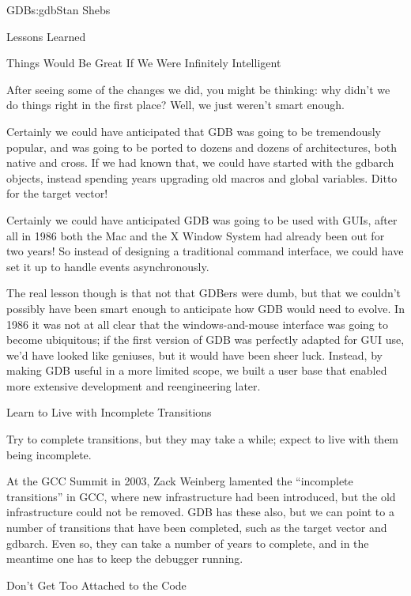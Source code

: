 \begin{aosachapter}{GDB}{s:gdb}{Stan Shebs}
\begin{aosasect1}{Lessons Learned}
\begin{aosasect2}{Things Would Be Great If We Were Infinitely Intelligent}

After seeing some of the changes we did, you might be thinking: why
didn't we do things right in the first place?  Well, we just weren't
smart enough.

Certainly we could have anticipated that GDB was going to be
tremendously popular, and was going to be ported to dozens and dozens
of architectures, both native and cross.  If we had known that, we
could have started with the gdbarch objects, instead spending years
upgrading old macros and global variables.  Ditto for the target
vector!

Certainly we could have anticipated GDB was going to be used with
GUIs, after all in 1986 both the Mac and the X Window System had
already been out for two years!  So instead of designing a traditional
command interface, we could have set it up to handle events
asynchronously.

The real lesson though is that not that GDBers were dumb, but that we
couldn't possibly have been smart enough to anticipate how GDB would
need to evolve.  In 1986 it was not at all clear that the
windows-and-mouse interface was going to become ubiquitous; if the
first version of GDB was perfectly adapted for GUI use, we'd have
looked like geniuses, but it would have been sheer luck.  Instead,
by making GDB useful in a more limited scope, we built a user base
that enabled more extensive development and reengineering later.

\end{aosasect2}

\begin{aosasect2}{Learn to Live with Incomplete Transitions}

Try to complete transitions, but they may take a while; expect to live
with them being incomplete.

At the GCC Summit in 2003, Zack Weinberg lamented the ``incomplete
transitions'' in GCC, where new infrastructure had been introduced,
but the old infrastructure could not be removed.  GDB has these also,
but we can point to a number of transitions that have been completed,
such as the target vector and gdbarch.  Even so, they can take a
number of years to complete, and in the meantime one has to keep the
debugger running.

\end{aosasect2}

\begin{aosasect2}{Don't Get Too Attached to the Code}


\end{aosasect2}
\end{aosasect1}
\end{aosachapter}
